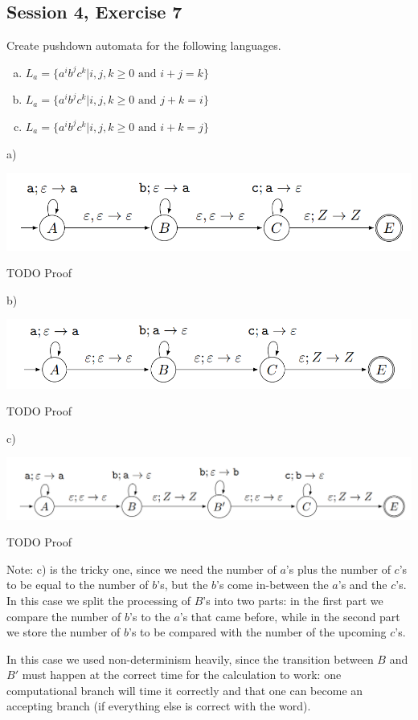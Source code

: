 \subsection{Session 4, Exercise 7}


Create pushdown automata for the following languages.
\begin{enumerate}[a)]
    \item $L_a = \{a^ib^jc^k | i,j,k \geq{} 0\text{ and }i+j = k\}$
    \item $L_a = \{a^ib^jc^k | i,j,k \geq{} 0\text{ and }j+k = i\}$
    \item $L_a = \{a^ib^jc^k | i,j,k \geq{} 0\text{ and }i+k = j\}$
\end{enumerate}



a)

\includegraphics[width=\linewidth]{04/4_7_a.png}

TODO Proof

b)

\includegraphics[width=\linewidth]{04/4_7_b.png}

TODO Proof

c)

\includegraphics[width=\linewidth]{04/4_7_c.png}

TODO Proof

Note: c) is the tricky one, since we need the number of $a$'s plus the number of $c$'s to be equal to the number of $b$'s, but the $b$'s come in-between the $a$'s and the $c$'s. In this case we split the processing of $B$'s into two parts: in the first part we compare the number of $b$'s to the $a$'s that came before, while in the second part we store the number of $b$'s to be compared with the number of the upcoming $c$'s.

In this case we used non-determinism heavily, since the transition between $B$ and $B'$ must happen at the correct time for the calculation to work: one computational branch will time it correctly and that one can become an accepting branch (if everything else is correct with the word).